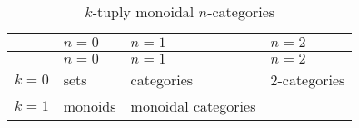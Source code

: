 \documentclass{article}
\begin{document}
\begin{longtable}[]{@{}llll@{}}
\caption{\(k\)-tuply monoidal \(n\)-categories}\tabularnewline
\toprule
\begin{minipage}[b]{0.26\columnwidth}\raggedright
\strut
\end{minipage} & \begin{minipage}[b]{0.21\columnwidth}\raggedright
\(n=0\)\strut
\end{minipage} & \begin{minipage}[b]{0.21\columnwidth}\raggedright
\(n=1\)\strut
\end{minipage} & \begin{minipage}[b]{0.21\columnwidth}\raggedright
\(n=2\)\strut
\end{minipage}\tabularnewline
\midrule
\endfirsthead
\toprule
\begin{minipage}[b]{0.26\columnwidth}\raggedright
\strut
\end{minipage} & \begin{minipage}[b]{0.21\columnwidth}\raggedright
\(n=0\)\strut
\end{minipage} & \begin{minipage}[b]{0.21\columnwidth}\raggedright
\(n=1\)\strut
\end{minipage} & \begin{minipage}[b]{0.21\columnwidth}\raggedright
\(n=2\)\strut
\end{minipage}\tabularnewline
\midrule
\endhead
\begin{minipage}[t]{0.26\columnwidth}\raggedright
\(k=0\)\strut
\end{minipage} & \begin{minipage}[t]{0.21\columnwidth}\raggedright
sets\strut
\end{minipage} & \begin{minipage}[t]{0.21\columnwidth}\raggedright
categories\strut
\end{minipage} & \begin{minipage}[t]{0.21\columnwidth}\raggedright
2-categories\strut
\end{minipage}\tabularnewline
\begin{minipage}[t]{0.26\columnwidth}\raggedright
\(k=1\)\strut
\end{minipage} & \begin{minipage}[t]{0.21\columnwidth}\raggedright
monoids\strut
\end{minipage} & \begin{minipage}[t]{0.21\columnwidth}\raggedright
monoidal categories\strut
\end{minipage} & \begin{minipage}[t]{0.21\columnwidth}\raggedright

\end{minipage}
\end{longtable}
\end{document}

